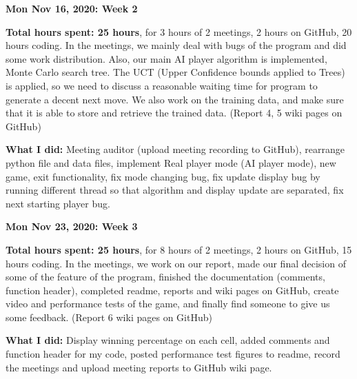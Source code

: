 \documentclass[12pt]{article}
\begin{document}
\textbf{Mon Nov 16, 2020: Week 2}

\textbf{Total hours spent: 25 hours}, for 3 hours of 2 meetings, 2 hours on GitHub, 20 hours coding.
In the meetings, we mainly deal with bugs of the program and did some work distribution. Also, our main AI player algorithm is implemented, Monte Carlo search tree. The UCT (Upper Confidence bounds applied to Trees) is applied, so we need to discuss a reasonable waiting time for program to generate a decent next move. We also work on the training data, and make sure that it is able to store and retrieve the trained data. (Report 4, 5 wiki pages on GitHub)

\textbf{What I did:} Meeting auditor (upload meeting recording to GitHub), rearrange python file and data files, implement Real player mode (AI player mode), new game, exit functionality, fix mode changing bug, fix update display bug by running different thread so that algorithm and display update are separated, fix next starting player bug.

\textbf{Mon Nov 23, 2020: Week 3}

\textbf{Total hours spent: 25 hours}, for 8 hours of 2 meetings, 2 hours on GitHub, 15 hours coding.
In the meetings, we work on our report, made our final decision of some of the feature of the program, finished the documentation (comments, function header), completed readme, reports and wiki pages on GitHub, create video and performance tests of the game, and finally find someone to give us some feedback. (Report 6 wiki pages on GitHub)

\textbf{What I did:} Display winning percentage on each cell, added comments and function header for my code, posted performance test figures to readme, record the meetings and upload meeting reports to GitHub wiki page.
\end{document}
